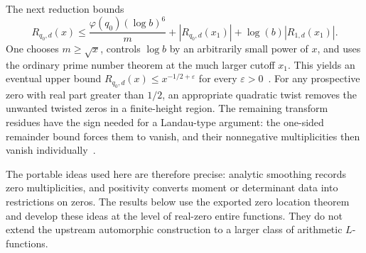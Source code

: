 The next reduction bounds
\[
 R_{q_0,d}(x)\le
 \frac{\varphi(q_0)(\log b)^6}{m}
 +|R_{q_0,d}(x_1)|+\log(b)|R_{1,d}(x_1)|.
\]
One chooses \(m\ge\sqrt{x}\), controls \(\log b\) by an arbitrarily small
power of \(x\), and uses the ordinary prime number theorem at the much larger
cutoff \(x_1\). This yields an eventual upper bound
\(R_{q_0,d}(x)\le x^{-1/2+\varepsilon}\) for every
\(\varepsilon>0\)~\cite{onesided}.
For any prospective zero with real part greater than \(1/2\), an appropriate
quadratic twist removes the unwanted twisted zeros in a finite-height
region. The remaining transform residues have the sign needed for a
Landau-type argument: the one-sided remainder bound forces them to vanish,
and their nonnegative multiplicities then vanish individually~\cite{criterion}.

The portable ideas used here are therefore precise: analytic smoothing
records zero multiplicities, and positivity converts moment or determinant
data into restrictions on zeros. The results below use the exported zero
location theorem and develop these ideas at the level of real-zero entire
functions. They do not extend the upstream automorphic construction to a
larger class of arithmetic \(L\)-functions.
